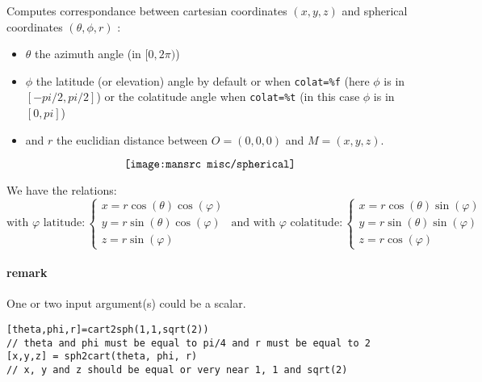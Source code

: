 \begin{mandescription}
  Computes correspondance between cartesian coordinates $(x,y,z)$ and spherical
  coordinates $(\theta,\phi,r)$ :
\begin{itemize}
\item $\theta$ the azimuth angle (in $[0,2\pi)$)
\item $\phi$ the latitude (or elevation) angle by default or
      when \verb+colat=%f+ (here $\phi$ is in $[-pi/2,pi/2]$) or 
      the colatitude angle when \verb+colat=%t+ (in this case  $\phi$ is in $[0,pi]$)
\item and $r$ the euclidian distance between $O=(0,0,0)$ and $M=(x,y,z)$.
\end{itemize}

$$
\texttt{[image: \\mansrc misc/spherical]} 
$$

We have the relations:
$$
\mbox{with } \varphi \mbox{ latitude}: 
\left\{\begin{array}{l}
x = r \cos(\theta) \cos(\varphi) \\
y = r \sin(\theta) \cos(\varphi) \\
z = r \sin(\varphi)
\end{array}\right.
\mbox{                  and with } \varphi \mbox{ colatitude}: 
\left\{ \begin{array}{l}
x = r \cos(\theta) \sin(\varphi) \\
y = r \sin(\theta) \sin(\varphi) \\
z = r \cos(\varphi)
\end{array} \right.
$$


\paragraph{remark}
One or two input argument(s) could be a scalar.
  
\end{mandescription}

\begin{examples}
\begin{Verbatim}
[theta,phi,r]=cart2sph(1,1,sqrt(2))
// theta and phi must be equal to pi/4 and r must be equal to 2
[x,y,z] = sph2cart(theta, phi, r)
// x, y and z should be equal or very near 1, 1 and sqrt(2)
\end{Verbatim}
\end{examples}


